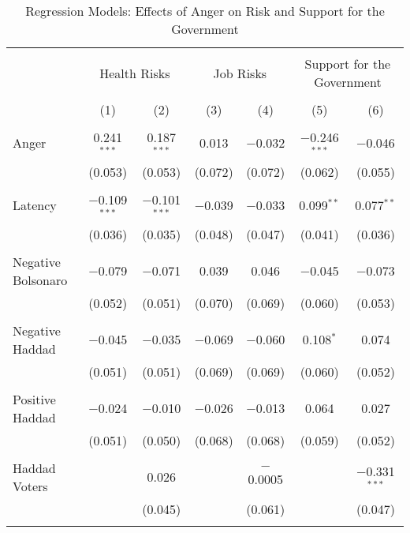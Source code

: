 
\begin{table}[!htbp] \centering 
  \caption{Regression Models: Effects of Anger on Risk and Support for the Government} 
  \label{autopsy} 
\begin{tabular}{@{\extracolsep{5pt}}lcccccc} 
\\[-1.8ex]\hline 
\hline \\[-1.8ex] 
 & \multicolumn{2}{c}{Health Risks} & \multicolumn{2}{c}{Job Risks} & \multicolumn{2}{c}{Support for the Government} \\ 
\\[-1.8ex] & (1) & (2) & (3) & (4) & (5) & (6)\\ 
\hline \\[-1.8ex] 
 Anger & 0.241$^{***}$ & 0.187$^{***}$ & 0.013 & $-$0.032 & $-$0.246$^{***}$ & $-$0.046 \\ 
  & (0.053) & (0.053) & (0.072) & (0.072) & (0.062) & (0.055) \\ 
  & & & & & & \\ 
 Latency & $-$0.109$^{***}$ & $-$0.101$^{***}$ & $-$0.039 & $-$0.033 & 0.099$^{**}$ & 0.077$^{**}$ \\ 
  & (0.036) & (0.035) & (0.048) & (0.047) & (0.041) & (0.036) \\ 
  & & & & & & \\ 
 Negative Bolsonaro & $-$0.079 & $-$0.071 & 0.039 & 0.046 & $-$0.045 & $-$0.073 \\ 
  & (0.052) & (0.051) & (0.070) & (0.069) & (0.060) & (0.053) \\ 
  & & & & & & \\ 
 Negative Haddad & $-$0.045 & $-$0.035 & $-$0.069 & $-$0.060 & 0.108$^{*}$ & 0.074 \\ 
  & (0.051) & (0.051) & (0.069) & (0.069) & (0.060) & (0.052) \\ 
  & & & & & & \\ 
 Positive Haddad & $-$0.024 & $-$0.010 & $-$0.026 & $-$0.013 & 0.064 & 0.027 \\ 
  & (0.051) & (0.050) & (0.068) & (0.068) & (0.059) & (0.052) \\ 
  & & & & & & \\ 
 Haddad Voters &  & 0.026 &  & $-$0.0005 &  & $-$0.331$^{***}$ \\ 
  &  & (0.045) &  & (0.061) &  & (0.047) \\ 
  & & & & & & \\ 

\end{tabular}
\end{table}
